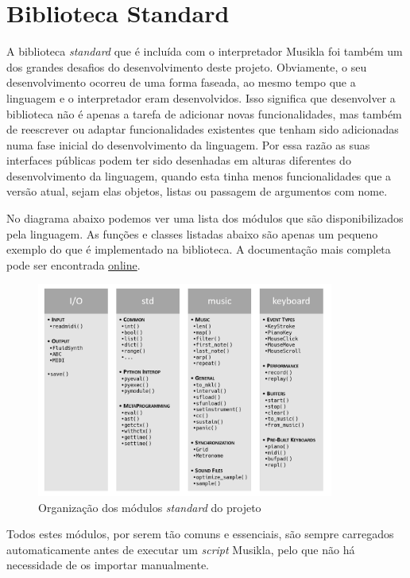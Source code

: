 \section{Biblioteca Standard}
A biblioteca \textit{standard} que é incluída com o interpretador Musikla foi também um dos grandes desafios do desenvolvimento deste projeto. Obviamente, o seu desenvolvimento ocorreu de uma forma faseada, ao mesmo tempo que a linguagem e o interpretador eram desenvolvidos. Isso significa que desenvolver a biblioteca não é apenas a tarefa de adicionar novas funcionalidades, mas também de reescrever ou adaptar funcionalidades existentes que tenham sido adicionadas numa fase inicial do desenvolvimento da linguagem. Por essa razão as suas interfaces públicas podem ter sido desenhadas em alturas diferentes do desenvolvimento da linguagem, quando esta tinha menos funcionalidades que a versão atual, sejam elas objetos, listas ou passagem de argumentos com nome.

No diagrama abaixo podemos ver uma lista dos módulos que são disponibilizados pela linguagem. As funções e classes listadas abaixo são apenas um pequeno exemplo do que é implementado na biblioteca. A documentação mais completa pode ser encontrada \href{https://pedromsilvapt.github.io/miei-dissertation/}{online}.

\begin{figure}[h]
\begin{center}
    \includegraphics[width=0.87\textwidth]{img/standard_library.png}
\end{center}
\caption{Organização dos módulos \textit{standard} do projeto}
\end{figure}

Todos estes módulos, por serem tão comuns e essenciais, são sempre carregados automaticamente antes de executar um \textit{script} Musikla, pelo que não há necessidade de os importar manualmente.

